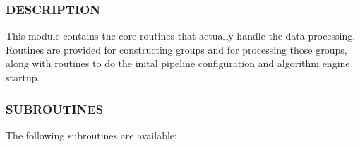 \subsubsection*{DESCRIPTION\label{ORAC::Core_DESCRIPTION}}


This module contains the core routines that actually handle the 
data processing. Routines are provided for constructing groups
and for processing those groups, along with routines to do the
inital pipeline configuration and algorithm engine startup.

\subsubsection*{SUBROUTINES\label{ORAC::Core_SUBROUTINES}}


The following subroutines are available:

